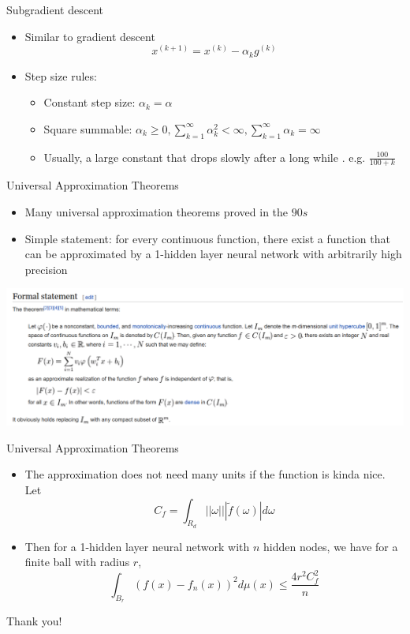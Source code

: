 \documentclass[12pt,notes,mathserif]{beamer}
\newcommand{\chuhao}{\fontsize{44.9pt}{\baselineskip}\selectfont}
\providecommand{\tightlist}{%
	\setlength{\itemsep}{0pt}\setlength{\parskip}{0pt}}
\begin{document}
\begin{frame}{Subgradient descent}

\begin{itemize}
\tightlist
\item
  Similar to gradient descent \[x^{(k+1)}=x^{(k)}-\alpha_k g^{(k)}\]
\item
  Step size rules:

  \begin{itemize}
  \tightlist
  \item
    Constant step size: \(\alpha_k = \alpha\)
  \item
    Square summable:
    \(\alpha_k\ge 0, \sum_{k=1}^{\infty} \alpha_k^2 < \infty, \sum_{k=1}^{\infty}\alpha_k =\infty\)
  \item
    Usually, a large constant that drops slowly after a long while .
    e.g. \(\frac{100}{100+k}\)
  \end{itemize}
\end{itemize}

\end{frame}

\begin{frame}{Universal Approximation Theorems}

\begin{itemize}
\tightlist
\item
  Many universal approximation theorems proved in the \(90s\)
\item
  Simple statement: for every continuous function, there exist a
  function that can be approximated by a 1-hidden layer neural network
  with arbitrarily high precision
\end{itemize}

\begin{center}
    \includegraphics[width=\textwidth]{2018-04-15-13-11-16.png}
\end{center}

\end{frame}

\begin{frame}{Universal Approximation Theorems}

\begin{itemize}
\tightlist
\item
  The approximation does not need many units if the function is kinda
  nice. Let \[C_{f}=\int_{R_{d}}||\omega|||\tilde{f}(\omega)|d\omega\]
\item
  Then for a 1-hidden layer neural network with \(n\) hidden nodes, we
  have for a finite ball with radius \(r\), \[
  \int_{B_{r}}(f(x)-f_{n}(x))^{2}d \mu(x)\leq\frac{4r^{2}C_{f}^{2}}{n}
  \]
\end{itemize}

\end{frame}

\begin{frame}
	\begin{center}
		\chuhao Thank you!  
	\end{center}
\end{frame}
\end{document}
